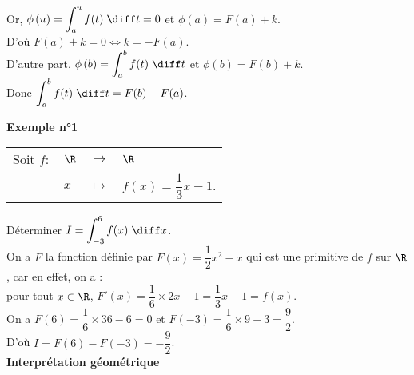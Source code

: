 Or, $\phi\left(u\right) = \displaystyle{\int_a^u f(t) \; \diff t} = 0$ et $\phi\left(a\right) = F(a) + k$. \\

D'où $F(a) + k = 0 \Longleftrightarrow k = -F(a)$. \\

D'autre part, $\phi\left(b\right) = \displaystyle{\int_a^b f(t) \; \diff t}$ et $\phi\left(b\right) = F(b) + k$. \\

Donc $\displaystyle{\int_a^b f(t) \; \diff t} = F(b) - F(a)$. \\

\vspace*{.5cm}

\newpage

\textbf{Exemple n°1} \\

\begin{tabular}{llll}
\hspace*{-.3cm} Soit $f:$ & $\R$ & $\longrightarrow$ & $\R$ \\
& $x$ & $\longmapsto$ & $f(x) = \dfrac{1}{3}x - 1$.
\end{tabular}

\vspace*{.3cm}

Déterminer $I = \displaystyle{\int_{-3}^6 f(x) \; \diff x}$. \\

On a $F$ la fonction définie par $F(x) = \dfrac{1}{2}x^2 - x$ qui est une primitive de $f$ sur $\R$, car en effet, on a : \vspace*{.2cm} \\ pour tout $x \in \R$, $F'(x) = \dfrac{1}{6} \times 2x - 1 = \dfrac{1}{3}x - 1 = f(x)$. \vspace*{.3cm} \\
 
On a $F(6) = \dfrac{1}{6} \times 36 - 6 = 0$
et $F(-3) = \dfrac{1}{6} \times 9 + 3 = \dfrac{9}{2}$. \\

D'où $I = F(6) - F(-3) = - \dfrac{9}{2}$. \\

\textbf{Interprétation géométrique}

